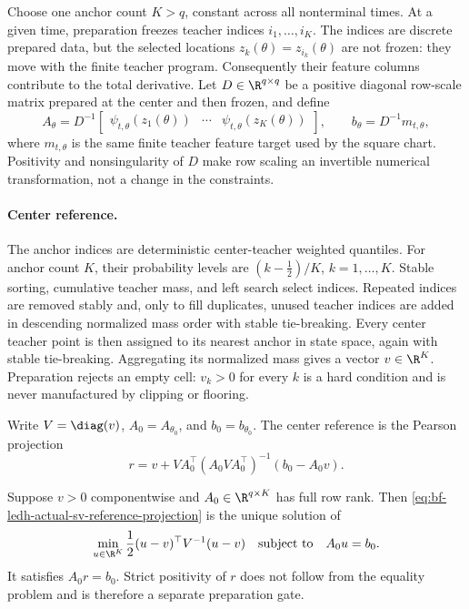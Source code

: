 Choose one anchor count \(K>q\), constant across all nonterminal times.  At a
given time, preparation freezes teacher indices \(i_1,\ldots,i_K\).  The
indices are discrete prepared data, but the selected locations
\(z_k(\theta)=z_{i_k}(\theta)\) are not frozen: they move with the finite
teacher program.  Consequently their feature columns contribute to the total
derivative.  Let \(D\in\R^{q\times q}\) be a positive diagonal row-scale
matrix prepared at the center and then frozen, and define
\begin{equation}
\label{eq:bf-ledh-actual-sv-scaled-system}
  A_\theta=D^{-1}
  \begin{bmatrix}
    \psi_{t,\theta}(z_1(\theta))&\cdots&
    \psi_{t,\theta}(z_K(\theta))
  \end{bmatrix},
  \qquad
  b_\theta=D^{-1}m_{t,\theta},
\end{equation}
where \(m_{t,\theta}\) is the same finite teacher feature target used by the
square chart.  Positivity and nonsingularity of \(D\) make row scaling an
invertible numerical transformation, not a change in the constraints.

\paragraph{Center reference.}
The anchor indices are deterministic center-teacher weighted quantiles.  For
anchor count \(K\), their probability levels are
\((k-\tfrac12)/K\), \(k=1,\ldots,K\).  Stable sorting, cumulative teacher mass,
and left search select indices.  Repeated indices are removed stably and, only
to fill duplicates, unused teacher indices are added in descending normalized
mass order with stable tie-breaking.  Every center teacher point is then
assigned to its nearest anchor in state space, again with stable tie-breaking.
Aggregating its normalized mass gives a vector \(v\in\R^K\).  Preparation
rejects an empty cell: \(v_k>0\) for every \(k\) is a hard condition and is
never manufactured by clipping or flooring.

Write \(V=\diag(v)\), \(A_0=A_{\theta_0}\), and \(b_0=b_{\theta_0}\).  The
center reference is the Pearson projection
\begin{equation}
\label{eq:bf-ledh-actual-sv-reference-projection}
  r=v+VA_0^\top(A_0VA_0^\top)^{-1}(b_0-A_0v).
\end{equation}

\begin{proposition}
\label{prop:bf-ledh-actual-sv-reference-projection}
Suppose \(v>0\) componentwise and \(A_0\in\R^{q\times K}\) has full row rank.
Then \eqref{eq:bf-ledh-actual-sv-reference-projection} is the unique solution of
\begin{equation}
\label{eq:bf-ledh-actual-sv-reference-program}
  \min_{u\in\R^K}
  \frac12(u-v)^\top V^{-1}(u-v)
  \quad\text{subject to}\quad A_0u=b_0.
\end{equation}
It satisfies \(A_0r=b_0\).  Strict positivity of \(r\) does not follow from the
equality problem and is therefore a separate preparation gate.
\end{proposition}

